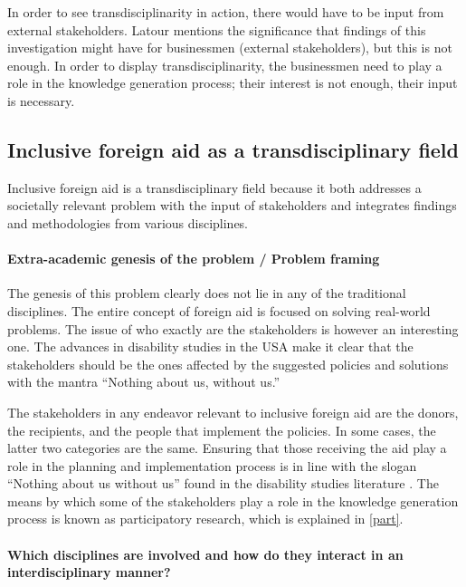 \documentclass[a4paper]{article}
\begin{document}
In order to see transdisciplinarity in action, there would have to be input
from external stakeholders. Latour mentions the significance that findings of
this investigation might have for businessmen (external stakeholders), but
this is not enough. In order to display transdisciplinarity, the businessmen
need to play a role in the knowledge generation process; their interest is not
enough, their input is necessary.




\subsection{Inclusive foreign aid as a transdisciplinary field}

Inclusive foreign aid is a transdisciplinary field because it both addresses a
societally relevant problem with the input of stakeholders and integrates
findings and methodologies from various disciplines.

\paragraph{Extra-academic genesis of the problem / Problem framing}

The genesis of this problem clearly does not lie in any of the traditional
disciplines. The entire concept of foreign aid is focused on solving
real-world problems. The issue of who exactly are the stakeholders is however
an interesting one. The advances in disability studies in the USA make it
clear that the stakeholders should be the ones affected by the suggested
policies and solutions with the mantra ``Nothing about us, without us.''

The stakeholders in any endeavor relevant to inclusive foreign aid are the
donors, the recipients, and the people that implement the policies. In some
cases, the latter two categories are the same. Ensuring that those receiving
the aid play a role in the planning and implementation process is in line with
the slogan ``Nothing about us without us'' found in the disability studies
literature \citep{pfeiffer2000disability}. The means by which some of the
stakeholders play a role in the knowledge generation process is known as
participatory research, which is explained in \autoref{part}.



\paragraph{Which disciplines are involved and how do they interact in an
interdisciplinary manner?}
\end{document}
